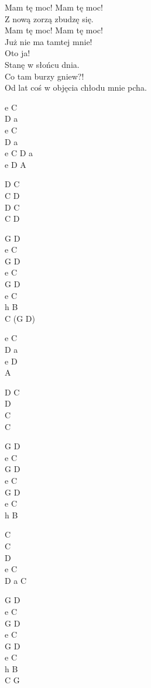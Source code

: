 \begin{text}
    Mam tę moc! Mam tę moc!\\
    Z nową zorzą zbudzę się.\\
    Mam tę moc! Mam tę moc!\\
    Już nie ma tamtej mnie!\\
    Oto ja!\\
    Stanę w słońcu dnia.\\
    Co tam burzy gniew?!\\
    Od lat coś w objęcia chłodu mnie pcha.
\end{text}
\begin{chord}
    e C\\
    D a\\
    e C\\
    D a\\
    e C D a\\
    e D A

    D C\\
    C D\\
    D C\\
    C D

    G D\\
    e C\\
    G D\\
    e C\\      
    G D\\
    e C\\
    h B\\
    C (G D)

    e C\\
    D a\\
    e D\\
    A

    D C\\
    D\\
    C\\
    C

    G D\\
    e C\\
    G D\\
    e C\\
    G D\\
    e C\\
    h B

    C\\
    C\\
    D\\
    e C\\
    D a C

    G D\\
    e C\\
    G D\\
    e C\\
    G D\\
    e C\\
    h B\\
    C G
\end{chord}